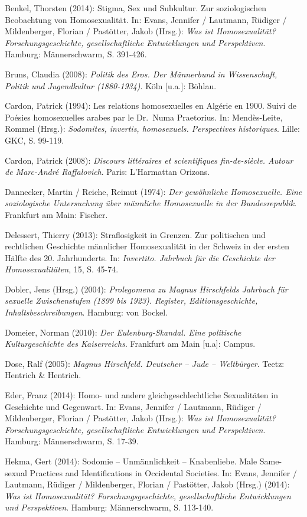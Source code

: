 \documentclass[a4paper,
fontsize=11pt,
oneside,
numbers=noperiodatend,
parskip=half-,
bibliography=totoc,
final
]{scrartcl}
\begin{document}
Benkel, Thorsten (2014): Stigma, Sex und Subkultur. Zur soziologischen
Beobachtung von Homosexualität. In: Evans, Jennifer / Lautmann, Rüdiger
/ Mildenberger, Florian / Pastötter, Jakob (Hrsg.): \emph{Was ist
Homosexualität? Forschungsgeschichte, gesellschaftliche Entwicklungen
und Perspektiven}. Hamburg: Männerschwarm, S. 391-426.

Bruns, Claudia (2008): \emph{Politik des Eros. Der Männerbund in
Wissenschaft, Politik und Jugendkultur (1880-1934)}. Köln {[}u.a.{]}:
Böhlau.

Cardon, Patrick (1994): Les relations homosexuelles en Algérie en 1900.
Suivi de Poésies homosexuelles arabes par le Dr.~Numa Praetorius. In:
Mendès-Leite, Rommel (Hrsg.): \emph{Sodomites, invertis, homosexuels.
Perspectives historiques}. Lille: GKC, S. 99-119.

Cardon, Patrick (2008): \emph{Discours littéraires et scientifiques
fin-de-siècle. Autour de Marc-André Raffalovich}. Paris: L'Harmattan
Orizons.

Dannecker, Martin / Reiche, Reimut (1974): \emph{Der gewöhnliche
Homosexuelle. Eine soziologische Untersuchung über männliche
Homosexuelle in der Bundesrepublik}. Frankfurt am Main: Fischer.

Delessert, Thierry (2013): Straflosigkeit in Grenzen. Zur politischen
und rechtlichen Geschichte männlicher Homosexualität in der Schweiz in
der ersten Hälfte des 20. Jahrhunderts. In: \emph{Invertito. Jahrbuch
für die Geschichte der Homosexualitäten}, 15, S. 45-74.

Dobler, Jens (Hrsg.) (2004): \emph{Prolegomena zu Magnus Hirschfelds
Jahrbuch für sexuelle Zwischenstufen (1899 bis 1923). Register,
Editionsgeschichte, Inhaltsbeschreibungen}. Hamburg: von Bockel.

Domeier, Norman (2010): \emph{Der Eulenburg-Skandal. Eine politische
Kulturgeschichte des Kaiserreichs}. Frankfurt am Main {[}u.a{]}: Campus.

Dose, Ralf (2005): \emph{Magnus Hirschfeld. Deutscher -- Jude --
Weltbürger}. Teetz: Hentrich \& Hentrich.

Eder, Franz (2014): Homo- und andere gleichgeschlechtliche Sexualitäten
in Geschichte und Gegenwart. In: Evans, Jennifer / Lautmann, Rüdiger /
Mildenberger, Florian / Pastötter, Jakob (Hrsg.): \emph{Was ist
Homosexualität? Forschungsgeschichte, gesellschaftliche Entwicklungen
und Perspektiven}. Hamburg: Männerschwarm, S. 17-39.

Hekma, Gert (2014): Sodomie -- Unmännlichkeit -- Knabenliebe. Male
Same-sexual Practices and Identifications in Occidental Societies. In:
Evans, Jennifer / Lautmann, Rüdiger / Mildenberger, Florian / Pastötter,
Jakob (Hrsg.) (2014): \emph{Was ist Homosexualität?
Forschungsgeschichte, gesellschaftliche Entwicklungen und Perspektiven}.
Hamburg: Männerschwarm, S. 113-140.
\end{document}
